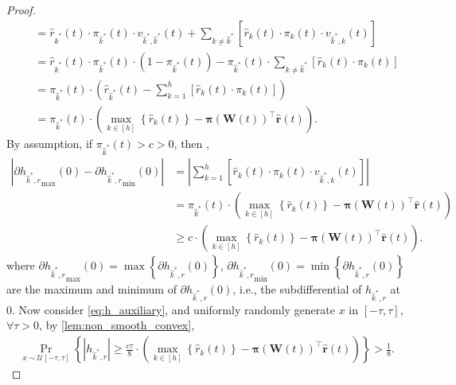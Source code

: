 \documentclass[10pt]{article}
\def\rvr{{\mathbf{r}}}
\def\rvpi{{\boldsymbol{\pi}}}
\def\rmW{{\mathbf{W}}}
\def\gU{{\mathcal{U}}}
\DeclareMathOperator*{\probability}{Pr}
\begin{document}
\begin{proof}
\begin{equation*}
\begin{split}
	&\quad = \hat{r}_{\hat{k}^*}\left(t\right) \cdot \pi_{\hat{k}^*}(t) \cdot v_{\hat{k}^*,\hat{k}^*}(t) + \sum\limits_{k\not=\hat{k}^*}{ \left[ \hat{r}_{k}\left(t\right) \cdot \pi_{k}(t) \cdot v_{\hat{k}^*,k}(t) \right] } \\
	&\quad = \hat{r}_{\hat{k}^*}\left(t\right) \cdot \pi_{\hat{k}^*}(t) \cdot \left( 1 - \pi_{\hat{k}^*}(t) \right) - \pi_{\hat{k}^*}(t) \cdot \sum\limits_{k\not=\hat{k}^*}{ \left[ \hat{r}_{k}\left(t\right) \cdot \pi_{k}(t) \right] } \\
	&\quad = \pi_{\hat{k}^*}(t) \cdot \left( \hat{r}_{\hat{k}^*}\left(t\right) - \sum\limits_{k=1}^{h}{ \left[ \hat{r}_{k}\left(t\right) \cdot \pi_{k}(t) \right] } \right) \\
	&\quad = \pi_{\hat{k}^*}(t) \cdot \left( \max\limits_{k \in \left[h\right]}\left\{ \hat{r}_k\left(t\right) \right\} - \rvpi\left( \rmW(t) \right)^\top \hat{\rvr}\left(t\right)  \right).
\end{split}
\end{equation*}
By assumption, if $\pi_{\hat{k}^*}(t) > c > 0$, then ,
\begin{equation*}
\begin{split}
	\left| \partial{h_{\hat{k}^*,r}}_{\max}{(0)} - \partial{h_{\hat{k}^*,r}}_{\min}{(0)} \right| &= \left| \sum\limits_{k=1}^{h}{ \left[  \hat{r}_{k}\left(t\right) \cdot \pi_{k}(t) \cdot v_{\hat{k}^*,k}(t) \right] } \right| \\
	&= \pi_{\hat{k}^*}(t) \cdot \left( \max\limits_{k \in \left[h\right]}\left\{ \hat{r}_k\left(t\right) \right\} - \rvpi\left( \rmW(t) \right)^\top \hat{\rvr}\left(t\right)  \right) \\
	&\ge c \cdot \left( \max\limits_{k \in \left[h\right]}\left\{ \hat{r}_k\left(t\right) \right\} - \rvpi\left( \rmW(t) \right)^\top \hat{\rvr}\left(t\right)  \right).
\end{split}
\end{equation*}
where $\partial{h_{\hat{k}^*,r}}_{\max}{(0)} = \max\left\{ \partial{h_{\hat{k}^*,r}}{(0)} \right\}$, $\partial{h_{\hat{k}^*,r}}_{\min}{(0)} = \min\left\{ \partial{h_{\hat{k}^*,r}}{(0)} \right\}$ are the maximum and minimum of $\partial{h_{\hat{k}^*,r}}{(0)}$, i.e., the subdifferential of $h_{\hat{k}^*,r}$ at $0$. Now consider \cref{eq:h_auxiliary}, and uniformly randomly generate $x$ in $\left[ -\tau, \tau \right]$, $\forall \tau > 0$, by \cref{lem:non_smooth_convex},
\begin{equation}
\label{eq:h_regret_lower_bound}
\begin{split}
	\probability\limits_{x \sim  \gU[-\tau, \tau]}\left\{ \left|  h_{\hat{k}^*,r} \right| \ge \frac{c\tau}{8} \cdot \left( \max\limits_{k \in \left[h\right]}\left\{ \hat{r}_k\left(t\right) \right\} - \rvpi\left( \rmW(t) \right)^\top \hat{\rvr}\left(t\right)  \right) \right\} > \frac{1}{8}.

\end{split}
\end{equation}
\end{proof}
\end{document}
